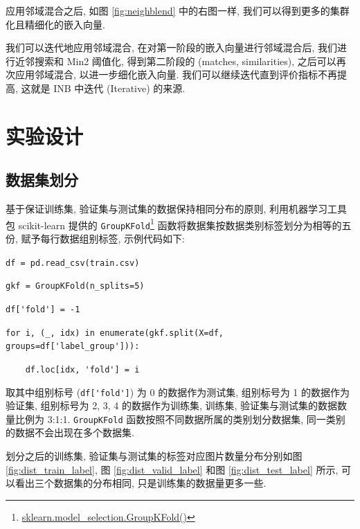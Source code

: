 \documentclass[12pt]{article}
\begin{document}
应用邻域混合之后, 如图 \ref{fig:neighblend} 中的右图一样, 我们可以得到更多的集群化且精细化的嵌入向量.

我们可以迭代地应用邻域混合, 在对第一阶段的嵌入向量进行邻域混合后, 我们进行近邻搜索和 Min2 阈值化, 得到第二阶段的 (matches, similarities), 之后可以再次应用邻域混合, 以进一步细化嵌入向量. 我们可以继续迭代直到评价指标不再提高, 这就是 INB 中迭代 (Iterative) 的来源.

\section{实验设计}

\subsection{数据集划分}


基于保证训练集, 验证集与测试集的数据保持相同分布的原则, 利用机器学习工具包 scikit-learn 提供的 \verb|GroupKFold|\footnote{\href{https://scikit-learn.org/stable/modules/generated/sklearn.model\_selection.GroupKFold.html\#sklearn.model_selection.GroupKFold}{sklearn.model\_selection.GroupKFold()}} 函数将数据集按数据类别标签划分为相等的五份, 赋予每行数据组别标签, 示例代码如下:

\verb|df = pd.read_csv(train.csv)|

\verb|gkf = GroupKFold(n_splits=5)|

\verb|df['fold'] = -1|

\verb|for i, (_, idx) in enumerate(gkf.split(X=df, groups=df['label_group'])):|

\verb|    df.loc[idx, 'fold'] = i|

取其中组别标号 (\verb|df['fold']|) 为 0 的数据作为测试集, 组别标号为 1 的数据作为验证集, 组别标号为 2, 3, 4 的数据作为训练集, 训练集, 验证集与测试集的数据数量比例为 3:1:1. \verb|GroupKFold| 函数按照不同数据所属的类别划分数据集, 同一类别的数据不会出现在多个数据集. 

划分之后的训练集, 验证集与测试集的标签对应图片数量分布分别如图 \ref{fig:dist_train_label}, 图 \ref{fig:dist_valid_label} 和图 \ref{fig:dist_test_label} 所示, 可以看出三个数据集的分布相同, 只是训练集的数据量更多一些.
\end{document}
